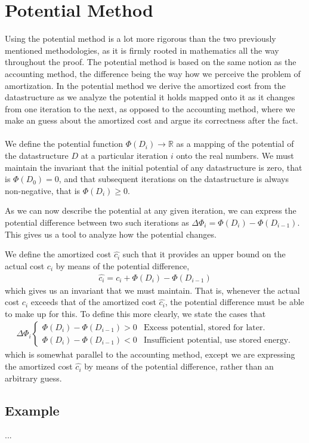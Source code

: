 \section{Potential Method}
Using the potential method is a lot more rigorous than the two previously
mentioned methodologies, as it is firmly rooted in mathematics all the way
throughout the proof. The potential method is based on the same notion as the
accounting method, the difference being the way how we perceive the problem of
amortization. In the potential method we derive the amortized cost from the
datastructure as we analyze the potential it holds mapped onto it as it
changes from one iteration to the next, as opposed to the accounting method,
where we make an guess about the amortized cost and argue its correctness
after the fact.
\\\\
We define the potential function $\Phi(D_i) \rightarrow \mathbb{R}$ as a
mapping of the potential of the datastructure $D$ at a particular iteration
$i$ onto the real numbers. We must maintain the invariant that the initial
potential of any datastructure is zero, that is $\Phi(D_0) = 0$, and that
subsequent iterations on the datastructure is always non-negative, that is
$\Phi(D_i) \geq 0$.

As we can now describe the potential at any given iteration, we can express
the potential difference between two such iterations as $\Delta\Phi_i =
\Phi(D_i) - \Phi(D_{i-1})$. This gives us a tool to analyze how the
potential changes.

We define the amortized cost $\hat{c_i}$ such that it provides an upper bound
on the actual cost $c_i$ by means of the potential difference,
\begin{align}
	\hat{c_i} = c_i + \Phi(D_i) - \Phi(D_{i-1})
\end{align}
which gives us an invariant that we must maintain. That is, whenever the
actual cost $c_i$ exceeds that of the amortized cost $\hat{c_i}$, the
potential difference must be able to make up for this. To define this more
clearly, we state the cases that
\begin{align}
	\Delta\Phi_i
	\begin{cases}
		\Phi(D_i) - \Phi(D_{i-1}) > 0 &
		\text{Excess potential, stored for later.} \\
		\Phi(D_i) - \Phi(D_{i-1}) < 0 &
		\text{Insufficient potential, use stored energy.}
	\end{cases}	
\end{align}
which is somewhat parallel to the accounting method, except we are expressing
the amortized cost $\hat{c_i}$ by means of the potential difference, rather
than an arbitrary guess.

\subsection{Example}
...

